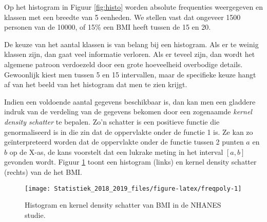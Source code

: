 \documentclass[12pt,dutch,coursenotes]{book}
\newenvironment{Shaded}{\begin{snugshade}}{\end{snugshade}}
\newcommand{\KeywordTok}[1]{\textcolor[rgb]{0.13,0.29,0.53}{\textbf{#1}}}
\newcommand{\DataTypeTok}[1]{\textcolor[rgb]{0.13,0.29,0.53}{#1}}
\newcommand{\DecValTok}[1]{\textcolor[rgb]{0.00,0.00,0.81}{#1}}
\newcommand{\StringTok}[1]{\textcolor[rgb]{0.31,0.60,0.02}{#1}}
\newcommand{\CommentTok}[1]{\textcolor[rgb]{0.56,0.35,0.01}{\textit{#1}}}
\newcommand{\OtherTok}[1]{\textcolor[rgb]{0.56,0.35,0.01}{#1}}
\newcommand{\OperatorTok}[1]{\textcolor[rgb]{0.81,0.36,0.00}{\textbf{#1}}}
\newcommand{\NormalTok}[1]{#1}
\theoremstyle{definition}
\theoremstyle{definition}
\theoremstyle{definition}
\theoremstyle{remark}
\begin{document}
Op het histogram in Figuur \ref{fig:histo} worden absolute frequenties
weergegeven en klassen met een breedte van 5 eenheden. We stellen vast
dat ongeveer 1500 personen van de 10000, of 15\% een BMI heeft tussen de
15 en 20.

De keuze van het aantal klassen is van belang bij een histogram. Als er
te weinig klassen zijn, dan gaat veel informatie verloren. Als er teveel
zijn, dan wordt het algemene patroon verdoezeld door een grote
hoeveelheid overbodige details. Gewoonlijk kiest men tussen 5 en 15
intervallen, maar de specifieke keuze hangt af van het beeld van het
histogram dat men te zien krijgt.

Indien een voldoende aantal gegevens beschikbaar is, dan kan men een
gladdere indruk van de verdeling van de gegevens bekomen door een
zogenaamde \emph{kernel density schatter} te bepalen. Zo'n schatter is
een positieve functie die genormaliseerd is in die zin dat de
oppervlakte onder de functie 1 is. Ze kan zo geïnterpreteerd worden dat
de oppervlakte onder de functie tussen 2 punten \(a\) en \(b\) op de
X-as, de kans voorstelt dat een lukrake meting in het interval \([a,b]\)
gevonden wordt. Figuur \ref{fig:freqpoly} toont een histogram (links) en
kernel density schatter (rechts) van de het BMI.

\begin{Shaded}
\end{Shaded}

\begin{figure}

{\centering \texttt{[image: Statistiek\_2018\_2019\_files/figure-latex/freqpoly-1]} 

}

\caption{Histogram en kernel density schatter van BMI in de NHANES studie.}\label{fig:freqpoly}
\end{figure}
\end{document}
